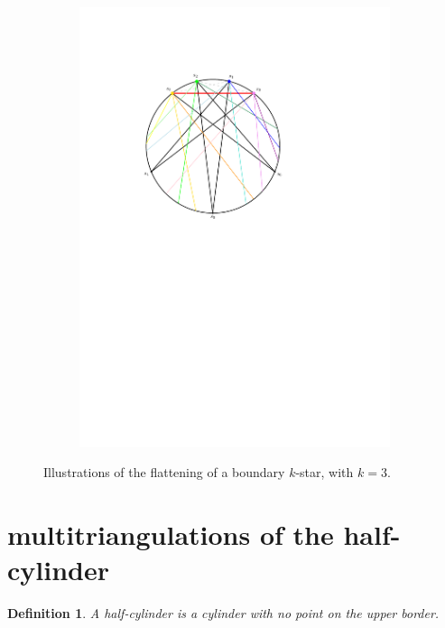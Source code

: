 \documentclass{amsart}
\newtheorem{definition}[theorem]{Definition}
\theoremstyle{remark}
\newcommand{\darkblue}{\color{darkblue}} %
\newcommand{\defn}[1]{\textsl{\darkblue #1}} %
\begin{document}
\begin{figure}
\begin{subfigure}[b]{.48\textwidth}
    \includegraphics[width=\textwidth,page=2]{exFlattening}
  \end{subfigure}
  \caption{Illustrations of the flattening of a boundary $k$-star, with $k=3$.}
  \label{fig:exProofStar}
\end{figure}


\section{multitriangulations of the half-cylinder}

\begin{definition}
A \defn{half-cylinder} is a cylinder with no point on the upper border.
\end{definition}
\end{document}
